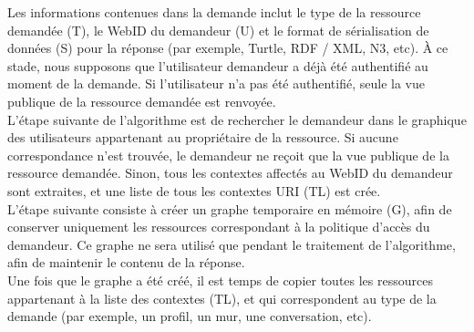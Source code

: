 \documentclass[a4paper]{article}
\begin{document}
Les informations contenues dans la demande inclut le type de la ressource demandée (T), le WebID du demandeur (U) et le format de sérialisation de données (S) pour la réponse (par exemple, Turtle, RDF / XML, N3, etc). À ce stade, nous supposons que l'utilisateur demandeur a déjà été authentifié au moment de la demande. Si l'utilisateur n'a pas été authentifié, seule la vue publique de la ressource demandée est renvoyée.\\


L'étape suivante de l'algorithme est de rechercher le demandeur dans le graphique des utilisateurs appartenant au propriétaire de la ressource. Si aucune correspondance n'est trouvée, le demandeur ne reçoit que la vue publique de la ressource demandée. Sinon, tous les contextes affectés au WebID du demandeur sont extraites, et une liste de tous les contextes URI (TL) est crée.\\


L'étape suivante consiste à créer un graphe temporaire en mémoire (G), afin de conserver uniquement les ressources correspondant à la politique d'accès du demandeur. Ce graphe ne sera utilisé que pendant le traitement de l'algorithme, afin de maintenir le contenu de la réponse.\\


Une fois que le graphe a été créé, il est temps de copier toutes les ressources appartenant à la liste des contextes (TL), et qui correspondent au type de la demande (par exemple, un profil, un mur, une conversation, etc).\\
\end{document}
